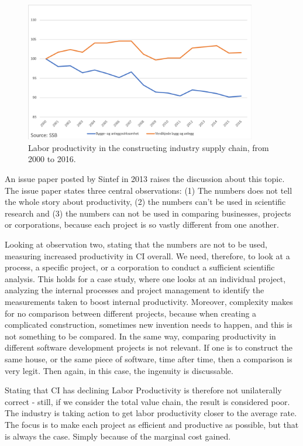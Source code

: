 \begin{figure}
    \centering
    \includegraphics[width=0.9\textwidth]{fig/ba_value_chain.png}
    \caption{Labor productivity in the constructing industry supply chain, from 2000 to 2016.}
    \label{fig:LP_supply_chain}
\end{figure}

An issue paper posted by Sintef in 2013 raises the discussion about this topic. The issue paper states three central observations: (1) The numbers does not tell the whole story about productivity, (2) the numbers can’t be used in scientific research and (3) the numbers can not be used in comparing businesses, projects or corporations, because each project is so vastly different from one another. 

Looking at observation two, stating that the numbers are not to be used, measuring increased productivity in CI overall. We need, therefore, to look at a process, a specific project, or a corporation to conduct a sufficient scientific analysis. This holds for a case study, where one looks at an individual project, analyzing the internal processes and project management to identify the measurements taken to boost internal productivity. Moreover, complexity makes for no comparison between different projects, because when creating a complicated construction, sometimes new invention needs to happen, and this is not something to be compared. In the same way, comparing productivity in different software development projects is not relevant. If one is to construct the same house, or the same piece of software, time after time, then a comparison is very legit. Then again, in this case, the ingenuity is discussable.

Stating that CI has declining Labor Productivity is therefore not unilaterally correct - still, if we consider the total value chain, the result is considered poor. The industry is taking action to get labor productivity closer to the average rate. The focus is to make each project as efficient and productive as possible, but that is always the case. Simply because of the marginal cost gained.

